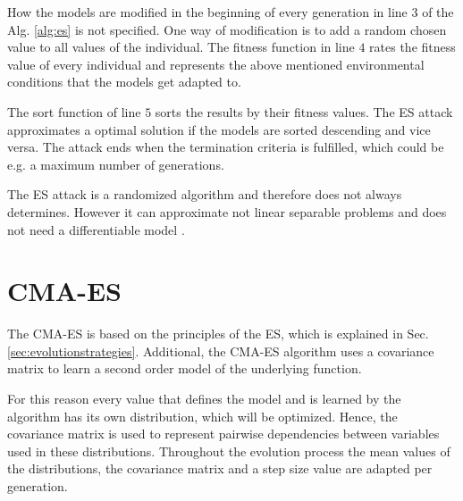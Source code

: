 How the models are modified in the beginning of every generation in line $3$ of the Alg. \ref{alg:es} is not specified.
One way of modification is to add a random chosen value to all values of the individual. %
The fitness function in line $4$ rates the fitness value of every individual and represents the above mentioned environmental conditions that the models get adapted to. %

The sort function of line $5$ sorts the results by their fitness values.
The \ac{ES} attack approximates a optimal solution if the models are sorted descending and vice versa. %
The attack ends when the termination criteria is fulfilled, which could be e.g. a maximum number of generations.

The \ac{ES} attack is a randomized algorithm and therefore does not always determines.
However it can approximate not linear separable problems and does not need a differentiable model \cite{Ruhrmair2010ModelingFunctions}.
	

\section{CMA-ES}
\label{sec:cma-es}

The \acf{CMA-ES} is based on the principles of the \ac{ES}, which is explained in Sec. \ref{sec:evolutionstrategies}.
Additional, the \ac{CMA-ES} algorithm uses a covariance matrix to learn a second order model of the underlying function.

For this reason every value that defines the model and is learned by the algorithm has its own distribution, which will be optimized.
Hence, the covariance matrix is used to represent pairwise dependencies between variables used in these distributions. %
Throughout the evolution process the mean values of the distributions, the covariance matrix and a step size value are adapted per generation. %

